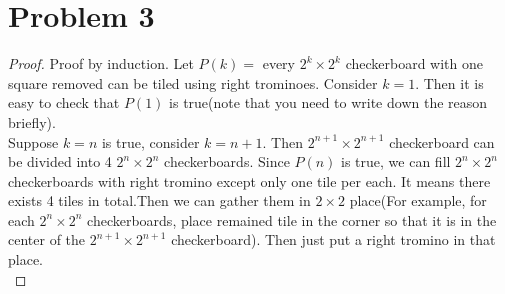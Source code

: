 \section*{Problem 3}
\begin{proof}
	Proof by induction. Let $P(k) = $ every $2^k\times2^k$ checkerboard with one square removed can be tiled
	using right trominoes. Consider $k = 1$. Then it is easy to check that $P(1)$ is true(note that you need to write down the reason briefly).\\
	Suppose $k = n$ is true, consider $k = n + 1$. Then $2^{n + 1}\times2^{n + 1}$ checkerboard can be divided into 4 $2^n\times2^n$ checkerboards. Since $P(n)$ is true, we can fill $2^n\times2^n$ checkerboards with right tromino except only one tile per each. It means there exists 4 tiles in total.Then we can gather them in $2\times2$ place(For example, for each $2^n\times2^n$ checkerboards, place remained tile in the corner so that it is in the center of the $2^{n + 1}\times2^{n + 1}$ checkerboard). Then just put a right tromino in that place.\\
\end{proof}
